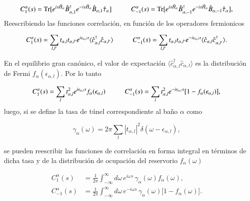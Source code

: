 \begin{appendixs}
\begin{equation*}
    C_{1}^{\alpha}(s) = \text{Tr}[e^{is\hat{H}_{\alpha}}\hat{B}^{\dagger}_{\alpha,1}e^{-is\hat{H}_{\alpha}}\hat{B}_{\alpha,1}\hat{\tau}_{\alpha}  ]  \hspace{10mm} C_{-1}^{\alpha}(s) = \text{Tr}[e^{is\hat{H}_{\alpha}}\hat{B}^{\dagger}_{\alpha,-1}e^{-is\hat{H}_{\alpha}}\hat{B}_{\alpha,-1}\hat{\tau}_{\alpha}  ], 
\end{equation*}
Reescribiendo las funciones correlación, en función de los operadores fermionicos

\begin{equation*}
    C_{1}^{\alpha}(s) = \sum_{l,l'}t_{\alpha,l}t_{\alpha,l'}e^{i\epsilon_{\alpha,l}s} \langle \hat{c}^{\dagger}_{\alpha,l}\hat{c}_{\alpha,l'} \rangle \hspace{10mm} C
    ^{\alpha}_{-1}(s) = \sum_{l,l'}t_{\alpha,l}t_{\alpha,l'}e^{-i\epsilon_{\alpha,l}s} \langle \hat{c}_{\alpha,l}\hat{c}^{\dagger}_{\alpha,l'} \rangle.
\end{equation*}

En el equilibrio gran canónico, el valor de expectación $\langle \hat{c}^{\dagger}_{\alpha,l}\hat{c}_{\alpha,l}\rangle$ es la distribución de Fermi $f_{\alpha}(\epsilon_{\alpha,l})$. Por lo tanto  

\begin{equation*}
    C_{1}^{\alpha}(s) = \sum_{l}t^{2}_{\alpha,l}e^{i\epsilon_{\alpha,l}s} f_{\alpha}(\epsilon_{\alpha,l}) \hspace{10mm} C
    ^{\alpha}_{-1}(s) = \sum_{l}t^{2}_{\alpha,l}e^{-i\epsilon_{\alpha,l}s} [1-f_{\alpha}(\epsilon_{\alpha,l})],
\end{equation*}
luego, si se define la tasa de túnel correspondiente al baño \( \alpha \) como

\begin{equation*}
    \gamma_{\alpha}(\omega) = 2\pi \sum_{l} |t_{\alpha,l}|^{2} \delta(\omega - \epsilon_{\alpha,l}),
\end{equation*}

se pueden reescribir las funciones de correlación en forma integral en términos de dicha tasa y de la distribución de ocupación del reservorio \( f_\alpha(\omega) \)

\begin{align*}
    C_{1}^{\alpha}(s) &= \frac{1}{2\pi} \int_{-\infty}^{\infty} d\omega\, e^{i\omega s}\, \gamma_{\alpha}(\omega) f_{\alpha}(\omega), \\
    C_{-1}^{\alpha}(s) &= \frac{1}{2\pi} \int_{-\infty}^{\infty} d\omega\, e^{-i\omega s}\, \gamma_{\alpha}(\omega)\big[1 - f_{\alpha}(\omega)\big].
\end{align*}


\end{appendixs}
